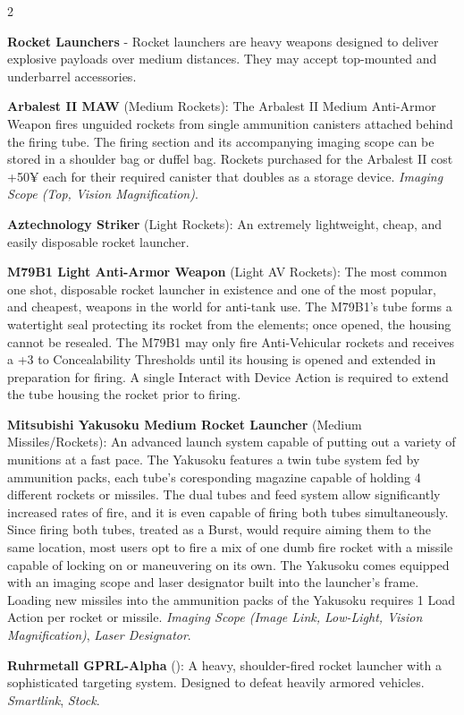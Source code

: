 \documentclass[
  oneside]{article}
\begin{document}
\begin{multicols}{2}

\textbf{Rocket Launchers} - Rocket launchers are
heavy weapons designed to deliver explosive
payloads over medium distances. They may accept
top-mounted and underbarrel accessories.

\textbf{Arbalest II MAW} (Medium Rockets): The
Arbalest II Medium Anti-Armor Weapon fires
unguided rockets from single ammunition canisters
attached behind the firing tube. The firing
section and its accompanying imaging scope can be
stored in a shoulder bag or duffel bag. Rockets
purchased for the Arbalest II cost +50¥ each for
their required canister that doubles as a storage
device. \emph{Imaging Scope (Top, Vision
Magnification)}.

\textbf{Aztechnology Striker} (Light Rockets): An
extremely lightweight, cheap, and easily
disposable rocket launcher.

\textbf{M79B1 Light Anti-Armor Weapon} (Light AV
Rockets): The most common one shot, disposable
rocket launcher in existence and one of the most
popular, and cheapest, weapons in the world for
anti-tank use. The M79B1's tube forms a watertight
seal protecting its rocket from the elements; once
opened, the housing cannot be resealed. The M79B1
may only fire Anti-Vehicular rockets and receives
a +3 to Concealability Thresholds until its
housing is opened and extended in preparation for
firing. A single Interact with Device Action is
required to extend the tube housing the rocket
prior to firing.

\textbf{Mitsubishi Yakusoku Medium Rocket
Launcher} (Medium Missiles/Rockets): An advanced
launch system capable of putting out a variety of
munitions at a fast pace. The Yakusoku features a
twin tube system fed by ammunition packs, each
tube's coresponding magazine capable of holding 4
different rockets or missiles. The dual tubes and
feed system allow significantly increased rates of
fire, and it is even capable of firing both tubes
simultaneously. Since firing both tubes, treated
as a Burst, would require aiming them to the same
location, most users opt to fire a mix of one dumb
fire rocket with a missile capable of locking on
or maneuvering on its own. The Yakusoku comes
equipped with an imaging scope and laser
designator built into the launcher's frame.
Loading new missiles into the ammunition packs of
the Yakusoku requires 1 Load Action per rocket or
missile. \emph{Imaging Scope (Image Link,
Low-Light, Vision Magnification)}, \emph{Laser
Designator}.

\textbf{Ruhrmetall GPRL-Alpha} (): A heavy,
shoulder-fired rocket launcher with a
sophisticated targeting system. Designed to defeat
heavily armored vehicles. \emph{Smartlink},
\emph{Stock}.

\end{multicols}
\end{document}
